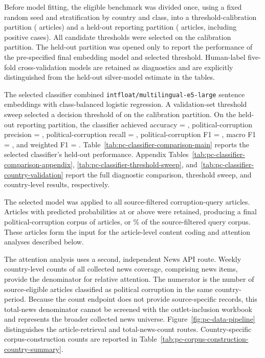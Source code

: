 Before model fitting, the eligible benchmark was divided once, using a fixed
random seed and stratification by country and class, into a threshold-calibration
partition (\PCCalibrationN{} articles) and a held-out reporting partition
(\PCHeldOutN{} articles, including \PCHeldOutPositiveN{} positive cases). All
candidate thresholds were selected on the calibration partition. The held-out
partition was opened only to report the performance of the pre-specified final
embedding model and selected threshold. Human-label five-fold cross-validation
models are retained as diagnostics and are explicitly distinguished from the
held-out silver-model estimate in the tables.

The selected classifier combined
\texttt{intfloat/}\allowbreak\texttt{multilingual-e5-large} sentence embeddings with
class-balanced logistic regression. A validation-set threshold sweep selected
a decision threshold of \PCThreshold{} on the calibration partition. On the
held-out reporting partition, the classifier achieved accuracy =
\PCTestAccuracy{}, political-corruption precision = \PCTestPrecision{},
political-corruption recall = \PCTestRecall{}, political-corruption F1 =
\PCTestFOne{}, macro F1 = \PCTestMacroFOne{}, and weighted F1 =
\PCTestWeightedFOne{}. Table~\ref{tab:pc-classifier-comparison-main}
reports the selected classifier's held-out performance. Appendix
Tables~\ref{tab:pc-classifier-comparison-appendix},
\ref{tab:pc-classifier-threshold-sweep},
and~\ref{tab:pc-classifier-country-validation} report the full diagnostic
comparison, threshold sweep, and country-level results, respectively.



The selected model was applied to all \PCSourceFilteredN{} source-filtered
corruption-query articles. Articles with predicted probabilities at or above
\PCThreshold{} were retained, producing a final political-corruption corpus of
\PCFinalN{} articles, or \PCFinalShare\% of the source-filtered query corpus. These articles form
the input for the article-level content coding and attention analyses described
below.

The attention analysis uses a second, independent News API route. Weekly
country-level counts of all collected news coverage, comprising \PCTotalNewsN{}
news items, provide the denominator for relative attention. The numerator is
the number of source-eligible articles classified as political corruption in
the same country-period. Because the count endpoint does not provide
source-specific records, this total-news denominator cannot be screened with
the outlet-inclusion workbook and represents the broader collected news
universe. Figure~\ref{fig:pc-data-pipeline} distinguishes the article-retrieval
and total-news-count routes. Country-specific corpus-construction counts are
reported in Table~\ref{tab:pc-corpus-construction-country-summary}.


